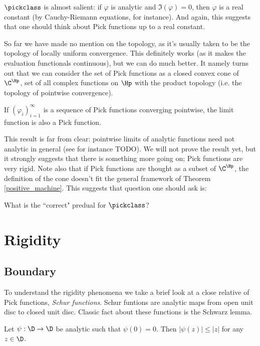 $\pickclass$ is almost salient: if $\varphi$ is analytic and $\Im(\varphi) = 0$, then $\varphi$ is a real constant (by Cauchy-Riemann equations, for instance). And again, this suggests that one should think about Pick functions up to a real constant.

So far we have made no mention on the topology, as it's usually taken to be the topology of locally uniform convergence. This definitely works (as it makes the evaluation functionals continuous), but we can do much better. It namely turns out that we can consider the set of Pick functions as a closed convex cone of $\C^{\Hp}$, set of all complex functions on $\Hp$ with the product topology (i.e. the topology of pointwise convergence).

\begin{prop}\label{pick_convergence}
	If $(\varphi_{i})_{i = 1}^{\infty}$ is a sequence of Pick functions converging pointwise, the limit function is also a Pick function.
\end{prop}

This result is far from clear: pointwise limits of analytic functions need not analytic in general (see for instance TODO). We will not prove the result yet, but it strongly suggests that there is something more going on; Pick functions are very rigid. Note also that if Pick functions are thought as a subset of $\C^{\Hp}$, the definition of the cone doesn't fit the general framework of Theorem \ref{positive_machine}. This suggests that question one should ask is:

\begin{quest}\label{pick_predual}
	What is the ``correct" predual for $\pickclass$?
\end{quest}


\section{Rigidity}

\subsection{Boundary}

To understand the rigidity phenomena we take a brief look at a close relative of Pick functions, \textit{Schur functions}. Schur funtions are analytic maps from open unit disc to closed unit disc. Classic fact about these functions is the Schwarz lemma.

\begin{lause}
	Let $\psi : \D \to \D$ be analytic such that $\psi(0) = 0$. Then $|\psi(z)| \leq |z|$ for any $z \in \D$.
\end{lause}


